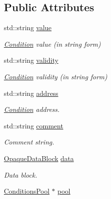 \subsection*{Public Attributes}
\begin{DoxyCompactItemize}
\item 
std\+::string \hyperlink{class_d_d4hep_1_1_conditions_1_1_interna_1_1_condition_object_a0b82a44322c732c5f5b99123eef28f63}{value}
\begin{DoxyCompactList}\small\item\em \hyperlink{class_d_d4hep_1_1_conditions_1_1_condition}{Condition} value (in string form) \end{DoxyCompactList}\item 
std\+::string \hyperlink{class_d_d4hep_1_1_conditions_1_1_interna_1_1_condition_object_a7f4bcc75be5d565396e3f09c91a23ede}{validity}
\begin{DoxyCompactList}\small\item\em \hyperlink{class_d_d4hep_1_1_conditions_1_1_condition}{Condition} validity (in string form) \end{DoxyCompactList}\item 
std\+::string \hyperlink{class_d_d4hep_1_1_conditions_1_1_interna_1_1_condition_object_ac30708fd16161d507f475cc81419be18}{address}
\begin{DoxyCompactList}\small\item\em \hyperlink{class_d_d4hep_1_1_conditions_1_1_condition}{Condition} address. \end{DoxyCompactList}\item 
std\+::string \hyperlink{class_d_d4hep_1_1_conditions_1_1_interna_1_1_condition_object_a4bd162e79c142737fd279493329bae42}{comment}
\begin{DoxyCompactList}\small\item\em Comment string. \end{DoxyCompactList}\item 
\hyperlink{class_d_d4hep_1_1_opaque_data_block}{Opaque\+Data\+Block} \hyperlink{class_d_d4hep_1_1_conditions_1_1_interna_1_1_condition_object_a049350e2cf3f94aa39a04edd0a18a018}{data}
\begin{DoxyCompactList}\small\item\em Data block. \end{DoxyCompactList}\item 
\hyperlink{class_d_d4hep_1_1_conditions_1_1_conditions_pool}{Conditions\+Pool} $\ast$ \hyperlink{class_d_d4hep_1_1_conditions_1_1_interna_1_1_condition_object_a47997f68ec8b07ffe938d869726b6012}{pool}

\end{DoxyCompactItemize}
